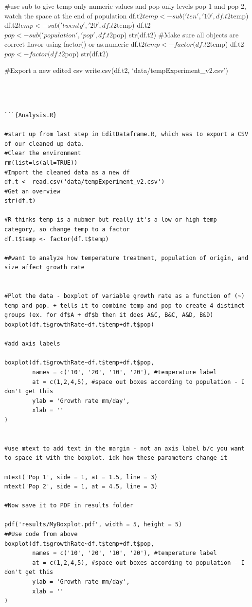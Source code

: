 \documentclass[
]{article}
\begin{document}
\#use sub to give temp only numeric values and pop only levels pop 1 and
pop 2, watch the space at the end of population
df.t2\(temp <- sub('ten', '10', df.t2\)temp)
df.t2\(temp <- sub('twenty', '20', df.t2\)temp)
df.t2\(pop <- sub('population ', 'pop', df.t2\)pop) str(df.t2) \#Make
sure all objects are correct flavor using factor() or as.numeric
df.t2\(temp <- factor(df.t2\)temp) df.t2\(pop <- factor(df.t2\)pop)
str(df.t2)

\#Export a new edited csv write.csv(df.t2,
`data/tempExperiment\_v2.csv')

\begin{verbatim}



```{Analysis.R}

#start up from last step in EditDataframe.R, which was to export a CSV of our cleaned up data. 
#Clear the environment
rm(list=ls(all=TRUE))
#Import the cleaned data as a new df
df.t <- read.csv('data/tempExperiment_v2.csv')
#Get an overview
str(df.t)

#R thinks temp is a nubmer but really it's a low or high temp category, so change temp to a factor
df.t$temp <- factor(df.t$temp)

##want to analyze how temperature treatment, population of origin, and size affect growth rate


#Plot the data - boxplot of variable growth rate as a function of (~) temp and pop. + tells it to combine temp and pop to create 4 distinct groups (ex. for df$A + df$b then it does A&C, B&C, A&D, B&D)
boxplot(df.t$growthRate~df.t$temp+df.t$pop)

#add axis labels

boxplot(df.t$growthRate~df.t$temp+df.t$pop,
        names = c('10', '20', '10', '20'), #temperature label
        at = c(1,2,4,5), #space out boxes according to population - I don't get this
        ylab = 'Growth rate mm/day',
        xlab = ''
)


#use mtext to add text in the margin - not an axis label b/c you want to space it with the boxplot. idk how these parameters change it

mtext('Pop 1', side = 1, at = 1.5, line = 3)
mtext('Pop 2', side = 1, at = 4.5, line = 3)

#Now save it to PDF in results folder

pdf('results/MyBoxplot.pdf', width = 5, height = 5)
##Use code from above
boxplot(df.t$growthRate~df.t$temp+df.t$pop,
        names = c('10', '20', '10', '20'), #temperature label
        at = c(1,2,4,5), #space out boxes according to population - I don't get this
        ylab = 'Growth rate mm/day',
        xlab = ''
)



\end{verbatim}
\end{document}

